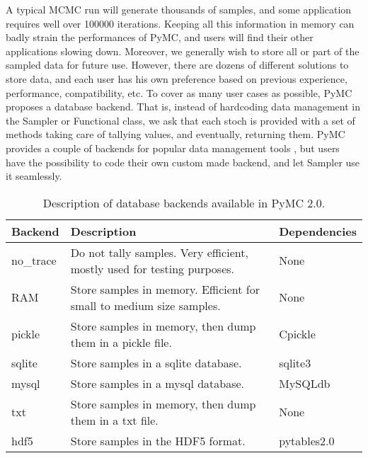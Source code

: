 

A typical MCMC run will generate thousands of samples, and some application requires well over 100000 iterations. Keeping all this information in memory can badly strain the performances of PyMC, and users will find their other applications slowing down. Moreover, we generally wish to store all or part of the sampled data for future use. However, there are dozens of different solutions to store data, and each user has his own preference based on previous experience, performance, compatibility, etc. To cover as many user cases as possible, PyMC proposes a database backend. That is, instead of hardcoding data management in the Sampler or Functional class, we ask that each stoch is provided with a set of methods taking care of tallying values, and eventually, returning them. PyMC provides a couple of backends for popular data management tools , but users have the possibility to code their own custom made backend, and let Sampler use it seamlessly.


\begin{longtable}[c]{|p{0.12\locallinewidth}|p{0.60\locallinewidth}|p{0.20\locallinewidth}|}
\caption{Description of database backends available in PyMC 2.0.}\\
\hline
\textbf{
Backend
} & \textbf{
Description
} & \textbf{
Dependencies
} \\
\hline
\endhead

no{\_}trace
 & 
Do not tally samples. Very efficient, mostly used
for testing purposes.
 & 
None
 \\
\hline

RAM
 & 
Store samples in memory. Efficient for small to
medium size samples.
 & 
None
 \\
\hline

pickle
 & 
Store samples in memory, then dump them in a
pickle file.
 & 
Cpickle
 \\
\hline

sqlite
 & 
Store samples in a sqlite database.
 & 
sqlite3
 \\
\hline

mysql
 & 
Store samples in a mysql database.
 & 
MySQLdb
 \\
\hline

txt
 & 
Store samples in memory, then dump them in a txt
file.
 & 
None
 \\
\hline

hdf5
 & 
Store samples in the HDF5 format.
 & 
pytables2.0
 \\
\hline
\end{longtable}

